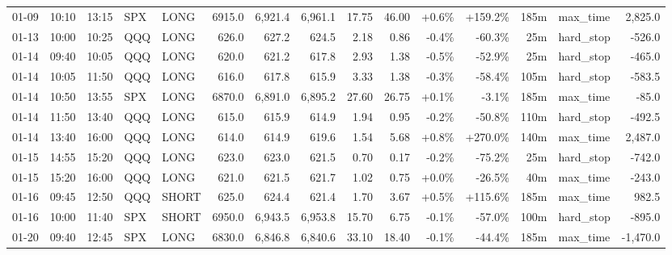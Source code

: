 \documentclass[11pt,a4paper,twoside]{article}
\begin{document}
\begin{landscape}
\begin{center}
\begin{longtable}{>{\color{txtmain}}l l l l l r r r r r r r r >{\color{txtmain}}l r}
01-09 & 10:10 & 13:15 & SPX & LONG & 6915.0 & 6,921.4 & 6,961.1 & 17.75 & 46.00 & \textcolor{wingreen}{+0.6\%} & \textcolor{wingreen}{+159.2\%} & 185m & max\_time & \textcolor{wingreen}{2,825.0} \\
01-13 & 10:00 & 10:25 & QQQ & LONG & 626.0 & 627.2 & 624.5 & 2.18 & 0.86 & \textcolor{lossred}{-0.4\%} & \textcolor{lossred}{-60.3\%} & 25m & hard\_stop & \textcolor{lossred}{-526.0} \\
01-14 & 09:40 & 10:05 & QQQ & LONG & 620.0 & 621.2 & 617.8 & 2.93 & 1.38 & \textcolor{lossred}{-0.5\%} & \textcolor{lossred}{-52.9\%} & 25m & hard\_stop & \textcolor{lossred}{-465.0} \\
01-14 & 10:05 & 11:50 & QQQ & LONG & 616.0 & 617.8 & 615.9 & 3.33 & 1.38 & \textcolor{lossred}{-0.3\%} & \textcolor{lossred}{-58.4\%} & 105m & hard\_stop & \textcolor{lossred}{-583.5} \\
01-14 & 10:50 & 13:55 & SPX & LONG & 6870.0 & 6,891.0 & 6,895.2 & 27.60 & 26.75 & \textcolor{wingreen}{+0.1\%} & \textcolor{lossred}{-3.1\%} & 185m & max\_time & \textcolor{lossred}{-85.0} \\
01-14 & 11:50 & 13:40 & QQQ & LONG & 615.0 & 615.9 & 614.9 & 1.94 & 0.95 & \textcolor{lossred}{-0.2\%} & \textcolor{lossred}{-50.8\%} & 110m & hard\_stop & \textcolor{lossred}{-492.5} \\
01-14 & 13:40 & 16:00 & QQQ & LONG & 614.0 & 614.9 & 619.6 & 1.54 & 5.68 & \textcolor{wingreen}{+0.8\%} & \textcolor{wingreen}{+270.0\%} & 140m & max\_time & \textcolor{wingreen}{2,487.0} \\
01-15 & 14:55 & 15:20 & QQQ & LONG & 623.0 & 623.0 & 621.5 & 0.70 & 0.17 & \textcolor{lossred}{-0.2\%} & \textcolor{lossred}{-75.2\%} & 25m & hard\_stop & \textcolor{lossred}{-742.0} \\
01-15 & 15:20 & 16:00 & QQQ & LONG & 621.0 & 621.5 & 621.7 & 1.02 & 0.75 & \textcolor{wingreen}{+0.0\%} & \textcolor{lossred}{-26.5\%} & 40m & max\_time & \textcolor{lossred}{-243.0} \\
01-16 & 09:45 & 12:50 & QQQ & SHORT & 625.0 & 624.4 & 621.4 & 1.70 & 3.67 & \textcolor{wingreen}{+0.5\%} & \textcolor{wingreen}{+115.6\%} & 185m & max\_time & \textcolor{wingreen}{982.5} \\
01-16 & 10:00 & 11:40 & SPX & SHORT & 6950.0 & 6,943.5 & 6,953.8 & 15.70 & 6.75 & \textcolor{lossred}{-0.1\%} & \textcolor{lossred}{-57.0\%} & 100m & hard\_stop & \textcolor{lossred}{-895.0} \\
01-20 & 09:40 & 12:45 & SPX & LONG & 6830.0 & 6,846.8 & 6,840.6 & 33.10 & 18.40 & \textcolor{lossred}{-0.1\%} & \textcolor{lossred}{-44.4\%} & 185m & max\_time & \textcolor{lossred}{-1,470.0} \\

\end{longtable}
\end{center}
\end{landscape}
\end{document}
